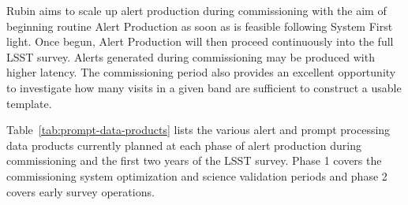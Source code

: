 Rubin aims to scale up alert production during commissioning with the aim of beginning routine Alert Production as soon as is feasible following System First light.
Once begun, Alert Production will then proceed continuously into the full LSST survey.
Alerts generated during commissioning may be produced with higher latency.
The commissioning period also provides an excellent opportunity to investigate how many visits in a given band are sufficient to construct a usable template.

Table~\ref{tab:prompt-data-products} lists the various alert and prompt processing data products currently planned at each phase of alert production during commissioning and the first two years of the LSST survey. 
Phase 1 covers the commissioning system optimization and science validation periods and phase 2 covers early survey operations.  


